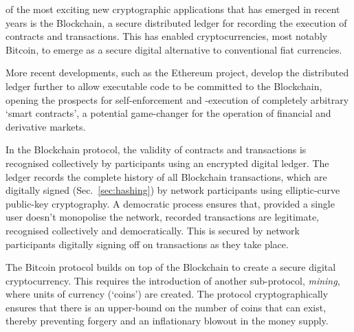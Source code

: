  of the most exciting new cryptographic applications that has emerged in recent years is the Blockchain, a secure distributed ledger for recording the execution of contracts and transactions. This has enabled cryptocurrencies, most notably Bitcoin, to emerge as a secure digital alternative to conventional fiat currencies.

More recent developments, such as the Ethereum project, develop the distributed ledger further to allow executable code to be committed to the Blockchain, opening the prospects for self-enforcement and -execution of completely arbitrary `smart contracts', a potential game-changer for the operation of financial and derivative markets.

In the Blockchain protocol, the validity of contracts and transactions is recognised collectively by participants using an encrypted digital ledger. The ledger records the complete history of all Blockchain transactions, which are digitally signed (Sec.~\ref{sec:hashing}) by network participants using elliptic-curve public-key cryptography. A democratic process ensures that, provided a single user doesn't monopolise the network, recorded transactions are legitimate, recognised collectively and democratically. This is secured by network participants digitally signing off on transactions as they take place.

The Bitcoin protocol builds on top of the Blockchain to create a secure digital cryptocurrency. This requires the introduction of another sub-protocol, \textit{mining}, where units of currency (`coins') are created. The protocol cryptographically ensures that there is an upper-bound on the number of coins that can exist, thereby preventing forgery and an inflationary blowout in the money supply.

